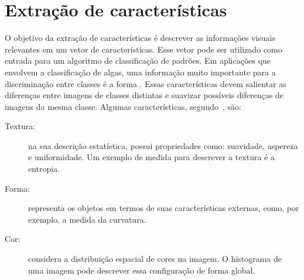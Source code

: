 




\section{Extração de características}
\label{sec:extracao}

O objetivo da extração de características é descrever as informações visuais relevantes em um vetor de características. Esse vetor pode ser utilizado como entrada para um algoritmo de classificação de padrões. Em aplicações que envolvem a classificação de algas, uma informação muito importante para a discriminação entre classes é a forma \cite{Borges2013}. Essas características devem salientar as diferenças entre imagens de classes distintas e suavizar possíveis diferenças de imagens da mesma classe. Algumas características, segundo~, são:

\begin{description}
\item [Textura:] na sua descrição estatística, possui propriedades como: suavidade, aspereza e uniformidade. Um exemplo de medida para descrever a textura é a entropia.
\item [Forma:] representa os objetos em termos de suas características externas, como, por exemplo, a medida da curvatura.
\item [Cor:] considera a distribuição espacial de cores na imagem. O histograma de uma imagem pode descrever essa configuração de forma global.
\end{description}

